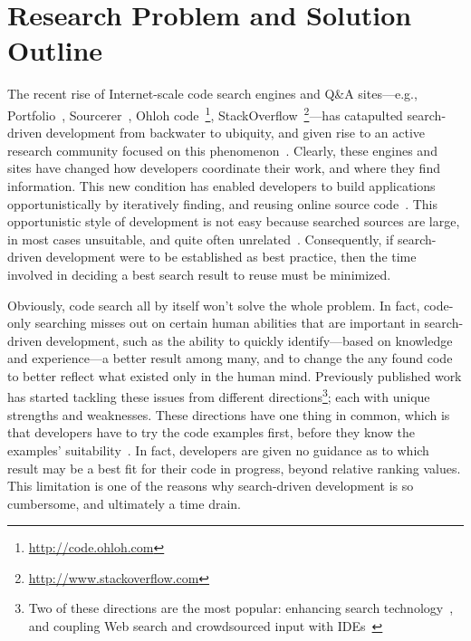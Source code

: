 \documentclass[conference]{IEEEtran}
\begin{document}
\section{Research Problem and Solution Outline}
\label{sec:intro}

The recent rise of Internet-scale code search engines and Q\&A sites---e.g., Portfolio~\cite{McMillan:2011wq}, Sourcerer~\cite{Bajracharya:2006vn}, Ohloh code~\footnote{\url{http://code.ohloh.com}}, StackOverflow~\footnote{\url{http://www.stackoverflow.com}}---has catapulted search-driven development from backwater to ubiquity, and given rise to an active research community focused on this phenomenon~\cite{Bajracharya:2009fj, Bajracharya:2010iy, Bajracharya:2011kw}. Clearly, these engines and sites have changed how developers coordinate their work, and where they find information. This new condition has enabled developers to build applications opportunistically by iteratively finding, and reusing online source code~\cite{Brandt:2008wi, Ncube:2008fm, Brandt:2009jb, McMillan:2012dj}. This opportunistic style of development is not easy because searched sources are large, in most cases unsuitable, and quite often unrelated~\cite{GallardoValencia:2009gr}. Consequently, if search-driven development were to be established as best practice, then the time involved in deciding a best search result to reuse must be minimized.

Obviously, code search all by itself won't solve the whole problem. In fact, code-only searching misses out on certain human abilities that are important in search-driven development, such as the ability to quickly identify---based on knowledge and experience---a better result among many, and to change the any found code to better reflect what existed only in the human mind. Previously published work has started tackling these issues from different directions\footnote{Two of these directions are the most popular: enhancing search technology~\cite{Bajracharya:2010um, Gysin:2010kt, McMillan:2012dj, Ying:2012tr}, and coupling Web search and crowdsourced input with IDEs~\cite{Bacchelli:2012dl, Brandt:2010tp, Oney:2012ge, Wightman:2012gc}}; each with unique strengths and weaknesses. These directions have one thing in common, which is that developers have to try the code examples first, before they know the examples' suitability~\cite{Sim:2011:WSE:2063239.2063243}. In fact, developers are given no guidance as to which result may be a best fit for their code in progress, beyond relative ranking values. This limitation is one of the reasons why search-driven development is so cumbersome, and ultimately a time drain.
\end{document}
